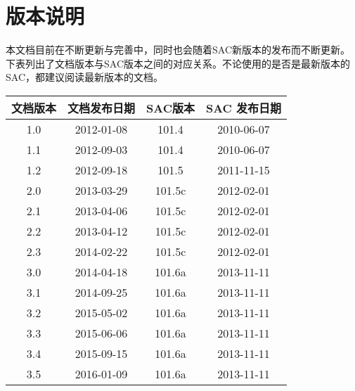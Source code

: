 {\section*{版本说明}}

本文档目前在不断更新与完善中，同时也会随着SAC新版本的发布而不断更新。
下表列出了文档版本与SAC版本之间的对应关系。不论使用的是否是最新版本的
SAC，都建议阅读最新版本的文档。

\begin{table}[H]
\centering
\begin{tabular}{cccc}
\toprule
文档版本    &   文档发布日期    &   SAC版本 &   SAC 发布日期\\
\midrule
1.0         &   2012-01-08      &   101.4   &   2010-06-07  \\
1.1         &   2012-09-03      &   101.4   &   2010-06-07  \\
1.2         &   2012-09-18      &   101.5   &   2011-11-15  \\
2.0         &   2013-03-29      &   101.5c  &   2012-02-01  \\
2.1         &   2013-04-06      &   101.5c  &   2012-02-01  \\
2.2         &   2013-04-12      &   101.5c  &   2012-02-01  \\
2.3         &   2014-02-22      &   101.5c  &   2012-02-01  \\
3.0         &   2014-04-18      &   101.6a  &   2013-11-11  \\
3.1         &   2014-09-25      &   101.6a  &   2013-11-11  \\
3.2         &   2015-05-02      &   101.6a  &   2013-11-11  \\
3.3         &   2015-06-06      &   101.6a  &   2013-11-11  \\
3.4         &   2015-09-15      &   101.6a  &   2013-11-11  \\
3.5         &   2016-01-09      &   101.6a  &   2013-11-11  \\
\bottomrule
\end{tabular}
\end{table}
